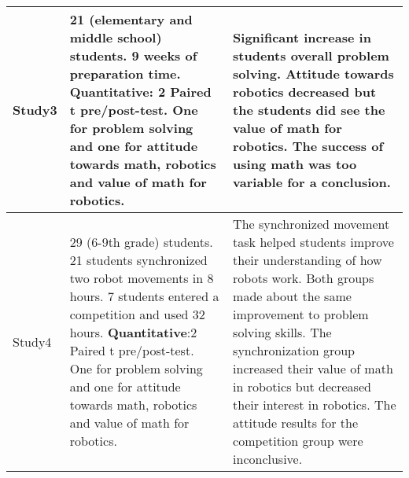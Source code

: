 \begin{longtable}{@{\extracolsep{\fill}}p{}p{}@{\hspace{10pt}}p{}}
	\tcite{silk2011resources}Study3 & 21 (elementary and middle school) students. 9 weeks of preparation time. \textbf{Quantitative}: 2 Paired t pre/post-test. One for problem solving and one for attitude towards math, robotics and value of math for robotics.  & Significant increase in students overall problem solving. Attitude towards robotics decreased but the students did see the value of math for robotics. The success of using math was too variable for a conclusion. \\\hline

	\tcite{silk2011resources}Study4 & 29 (6-9th grade) students. 21 students synchronized two robot movements in 8 hours. 7 students entered a competition and used 32 hours. \textbf{Quantitative}:2 Paired t pre/post-test. One for problem solving and one for attitude towards math, robotics and value of math for robotics. & The synchronized movement task helped students improve their understanding of how robots work. Both groups made about the same improvement to problem solving skills. The synchronization group increased their value of math in robotics but decreased their interest in robotics. The attitude results for the competition group were inconclusive. \\\hline
		
		
\end{longtable}

